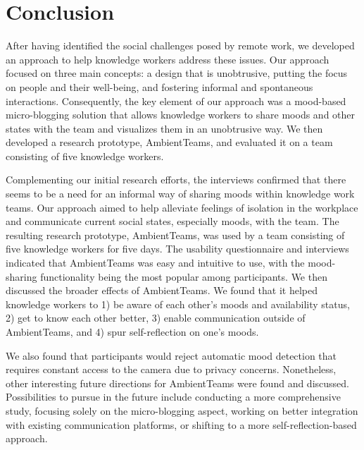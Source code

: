 \chapter{Conclusion}
\label{chapter:conclusion}
After having identified the social challenges posed by remote work, we developed an approach to help knowledge workers address these issues. Our approach focused on three main concepts: a design that is unobtrusive, putting the focus on people and their well-being, and fostering informal and spontaneous interactions. Consequently, the key element of our approach was a mood-based micro-blogging solution that allows knowledge workers to share moods and other states with the team and visualizes them in an unobtrusive way. We then developed a research prototype, AmbientTeams, and evaluated it on a team consisting of five knowledge workers.

Complementing our initial research efforts, the interviews confirmed that there seems to be a need for an informal way of sharing moods within knowledge work teams. Our approach aimed to help alleviate feelings of isolation in the workplace and communicate current social states, especially moods, with the team. The resulting research prototype, AmbientTeams, was used by a team consisting of five knowledge workers for five days. The usability questionnaire and interviews indicated that AmbientTeams was easy and intuitive to use, with the mood-sharing functionality being the most popular among participants. We then discussed the broader effects of AmbientTeams. We found that it helped knowledge workers to 1) be aware of each other's moods and availability status, 2) get to know each other better, 3) enable communication outside of AmbientTeams, and 4) spur self-reflection on one's moods.

We also found that participants would reject automatic mood detection that requires constant access to the camera due to privacy concerns. Nonetheless, other interesting future directions for AmbientTeams were found and discussed. Possibilities to pursue in the future include conducting a more comprehensive study, focusing solely on the micro-blogging aspect, working on better integration with existing communication platforms, or shifting to a more self-reflection-based approach.